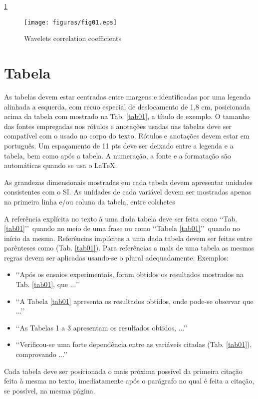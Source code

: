\ref{fig01}
\begin{figure}[h]
	\centering
	\texttt{[image: figuras/fig01.eps]}
	\caption{Wavelets correlation coefficients}
	\label{fig01}
\end{figure}

\section{Tabela}

As tabelas devem estar centradas entre margens e identificadas por uma legenda 
alinhada a esquerda, com recuo especial de deslocamento de 1,8 cm, posicionada 
acima da tabela com mostrado na Tab. \ref{tab01}, a título de 
exemplo. O tamanho das fontes empregadas nos rótulos e anotações usadas nas 
tabelas deve ser compatível com o usado no corpo do texto. Rótulos e anotações 
devem estar em português. Um espaçamento de 11 pts deve ser deixado entre a 
legenda e a tabela, bem como após a tabela. A numeração, a fonte e a formatação
são automáticas quando se usa o \LaTeX.

As grandezas dimensionais mostradas em cada tabela devem apresentar unidades 
consistentes com o SI. As unidades de cada variável devem ser mostradas apenas 
na primeira linha e/ou coluna da tabela, entre colchetes 

A referência explícita no texto à uma dada tabela deve ser feita como 
\lq\lq Tab. \ref{tab01}\rq\rq\ quando no meio de uma frase ou como 
\lq\lq Tabela \ref{tab01}\rq\rq\ quando no início da mesma. Referências 
implícitas a uma dada tabela devem ser feitas entre parênteses como 
(Tab. \ref{tab01}). Para referências a mais de uma tabela as mesmas 
regras devem ser aplicadas usando-se o plural adequadamente. Exemplos:
\begin{itemize}
	\item \lq\lq Após os ensaios experimentais, foram obtidos os resultados 
	mostrados na Tab. \ref{tab01}, que ...\rq\rq
	\item \lq\lq A Tabela \ref{tab01} apresenta os resultados obtidos, onde 
	pode-se observar que ...\rq\rq
	\item \lq\lq As Tabelas 1 a 3 apresentam os resultados obtidos, ...\rq\rq
	\item \lq\lq Verificou-se uma forte dependência entre as variáveis citadas 
	(Tab. \ref{tab01}), comprovando ...\rq\rq
\end{itemize}

Cada tabela deve ser posicionada o mais próxima possível da primeira citação 
feita à mesma no texto, imediatamente após o parágrafo no qual é feita a 
citação, se possível, na mesma página.

